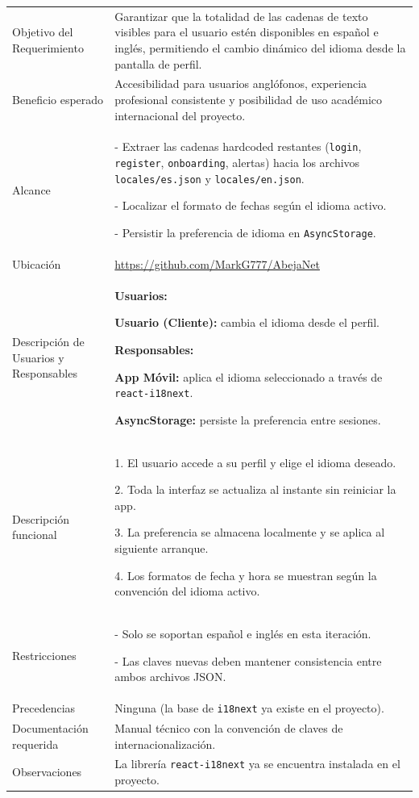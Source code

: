 \noindent
\begin{tabular}{|p{4.5cm}|p{11cm}|}
\hline
\rowcolor{secVerde}\multicolumn{2}{|l|}{\color{white}\textbf{3. DESCRIPCIÓN DEL REQUERIMIENTO}} \\
\hline
Objetivo del Requerimiento &
Garantizar que la totalidad de las cadenas de texto visibles para el usuario estén disponibles en español e inglés, permitiendo el cambio dinámico del idioma desde la pantalla de perfil. \\
\hline
Beneficio esperado &
Accesibilidad para usuarios anglófonos, experiencia profesional consistente y posibilidad de uso académico internacional del proyecto. \\
\hline
Alcance &
- Extraer las cadenas hardcoded restantes (\texttt{login}, \texttt{register}, \texttt{onboarding}, alertas) hacia los archivos \texttt{locales/es.json} y \texttt{locales/en.json}. \par
- Localizar el formato de fechas según el idioma activo. \par
- Persistir la preferencia de idioma en \texttt{AsyncStorage}. \\
\hline
Ubicación & \url{https://github.com/MarkG777/AbejaNet} \\ \hline
Descripción de Usuarios y Responsables &
\textbf{Usuarios:} \par
\textbf{Usuario (Cliente):} cambia el idioma desde el perfil. \par
\vspace{0.1cm}
\textbf{Responsables:} \par
\textbf{App Móvil:} aplica el idioma seleccionado a través de \texttt{react-i18next}. \par
\textbf{AsyncStorage:} persiste la preferencia entre sesiones. \\
\hline
Descripción funcional &
1. El usuario accede a su perfil y elige el idioma deseado. \par
2. Toda la interfaz se actualiza al instante sin reiniciar la app. \par
3. La preferencia se almacena localmente y se aplica al siguiente arranque. \par
4. Los formatos de fecha y hora se muestran según la convención del idioma activo. \\
\hline
Restricciones &
- Solo se soportan español e inglés en esta iteración. \par
- Las claves nuevas deben mantener consistencia entre ambos archivos JSON. \\
\hline
Precedencias & Ninguna (la base de \texttt{i18next} ya existe en el proyecto). \\ \hline
Documentación requerida & Manual técnico con la convención de claves de internacionalización. \\ \hline
Observaciones & La librería \texttt{react-i18next} ya se encuentra instalada en el proyecto. \\ \hline
\end{tabular}

